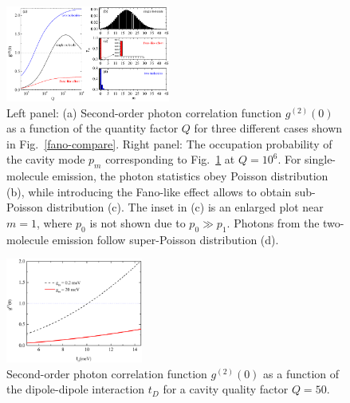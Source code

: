 \documentclass[aps,prb,
superscriptaddress,
,twocolumn
,floatfix,footinbib,longbibliography,
]{revtex4-2}
\begin{document}
 \begin{figure}[h]
\centering
\includegraphics[width=0.48\textwidth]{fano-rp.pdf}
\caption{Left panel: (a) Second-order photon correlation function $g^{(2)}(0)$ as a function of the quantity factor $Q$ for three different cases shown in Fig.~\ref{fano-compare}. Right panel: The occupation probability of the cavity mode $p_{m}$ corresponding to Fig.~\ref{fano-rp} at $Q=10^{6}$.
For single-molecule emission, the photon statistics obey Poisson distribution (b), while introducing the Fano-like effect allows to obtain sub-Poisson distribution (c). The inset in (c) is an enlarged plot near $m=1$, where $p_{0}$ is not shown due to $p_{0}\gg p_{1}$. Photons  from the two-molecule emission follow super-Poisson distribution (d).}
\label{fano-rp}
\end{figure}

\begin{figure}[h]
\centering
\includegraphics[width=0.4\textwidth]{fano-td.pdf}
\caption{Second-order photon correlation function $g^{(2)}(0)$ as a function of the dipole-dipole interaction $t_{D}$ for a cavity quality factor $Q=50$.}
\label{fano-td}
\end{figure}
\end{document}
